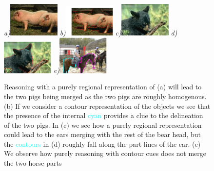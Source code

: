 \begin{figure}[ht]
\centering
{\footnotesize\textit{a)}}\includegraphics[width=0.229\textwidth]{figs/piggies.png}
{\footnotesize\textit{b)}}\includegraphics[width=0.229\textwidth]{figs/piggies_cons.pdf}
{\footnotesize\textit{c)}}\includegraphics[width=0.229\textwidth]{figs/bear_head.png}
{\footnotesize\textit{d)}}\includegraphics[width=0.229\textwidth]{figs/bear_head_cons.pdf}
{\footnotesize\textit{e)}}\includegraphics[width=0.229\textwidth]{figs/horse_occluded.pdf}
\caption{Reasoning with a purely regional representation of (a) will lead to the two pigs being merged as the two pigs are roughly homogenous. (b) If we consider a contour representation of the objects we see that the presence of the internal \textcolor{cyan}{cyan} provides a clue to the delineation of the two pigs. In (c) we see how a purely regional representation could lead to the ears merging with the rest of the bear head, but the \textcolor{cyan}{contours} in (d) roughly fall along the part lines of the ear. (e) We observe how purely reasoning with contour cues does not merge the two horse parts} 
\label{fig:cons_vs_regions}
\end{figure}

